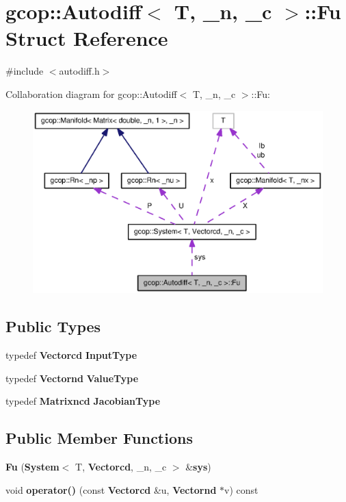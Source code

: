 \section{gcop\-:\-:\-Autodiff$<$ \-T, \-\_\-n, \-\_\-c $>$\-:\-:\-Fu \-Struct \-Reference}
\label{structgcop_1_1Autodiff_1_1Fu}


{\ttfamily \#include $<$autodiff.\-h$>$}



\-Collaboration diagram for gcop\-:\-:\-Autodiff$<$ \-T, \-\_\-n, \-\_\-c $>$\-:\-:\-Fu\-:
\nopagebreak
\begin{figure}[H]
\begin{center}
\leavevmode
\includegraphics[width=350pt]{structgcop_1_1Autodiff_1_1Fu__coll__graph}
\end{center}
\end{figure}
\subsection*{\-Public \-Types}
\begin{DoxyCompactItemize}
\item 
typedef {\bf \-Vectorcd} {\bf \-Input\-Type}
\item 
typedef {\bf \-Vectornd} {\bf \-Value\-Type}
\item 
typedef {\bf \-Matrixncd} {\bf \-Jacobian\-Type}
\end{DoxyCompactItemize}
\subsection*{\-Public \-Member \-Functions}
\begin{DoxyCompactItemize}
\item 
{\bf \-Fu} ({\bf \-System}$<$ \-T, {\bf \-Vectorcd}, \-\_\-n, \-\_\-c $>$ \&{\bf sys})
\item 
void {\bf operator()} (const {\bf \-Vectorcd} \&u, {\bf \-Vectornd} $\ast$v) const 
\end{DoxyCompactItemize}
